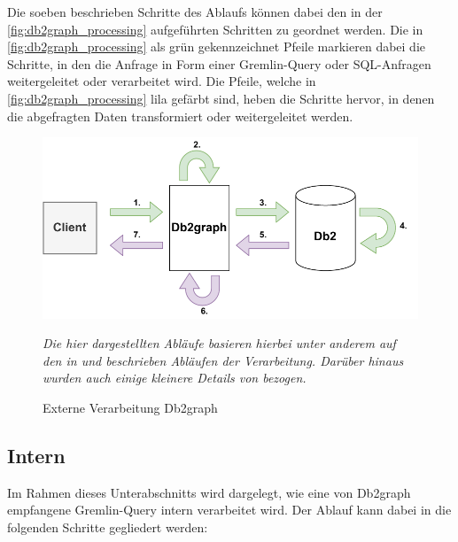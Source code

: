 Die soeben beschrieben Schritte des Ablaufs können dabei den in der \autoref{fig:db2graph_processing} aufgeführten Schritten zu geordnet werden. Die in \autoref{fig:db2graph_processing} als grün gekennzeichnet Pfeile markieren dabei die Schritte, in den die Anfrage in Form einer Gremlin-Query oder SQL-Anfragen weitergeleitet oder verarbeitet wird. Die Pfeile, welche in \autoref{fig:db2graph_processing} lila gefärbt sind, heben die Schritte hervor, in denen die abgefragten Daten transformiert oder weitergeleitet werden.

\begin{figure}[h]
    \centering
    \includegraphics[width=\textwidth]{images/db2graph_processing.pdf}
    \caption{Externe Verarbeitung Db2graph}
    \label{fig:db2graph_processing}
    \vspace{1em}
    \textit{Die hier dargestellten Abläufe basieren hierbei unter anderem auf den in \cite{vldb_tian} und \cite{sigmod_tian} beschrieben Abläufen der Verarbeitung. Darüber hinaus wurden auch einige kleinere Details von \cite{tinkerpop_2020} bezogen.} 
\end{figure}

\subsection{Intern}
Im Rahmen dieses Unterabschnitts wird dargelegt, wie eine von Db2graph empfangene Gremlin-Query intern verarbeitet wird. Der Ablauf kann dabei in die folgenden Schritte gegliedert werden: 

